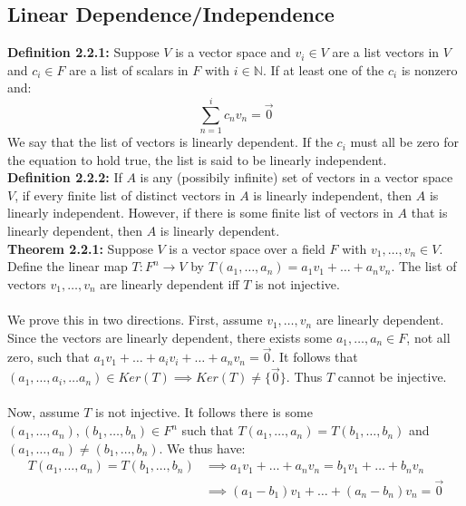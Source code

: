 \documentclass[11pt]{article}
\begin{document}
\newpage

\subsection{Linear Dependence/Independence}

\textbf{Definition 2.2.1:} Suppose $V$ is a vector space and $v_i \in V$ are a list vectors in $V$ and $c_i \in F$ are a list of scalars in $F$ with $i \in \mathbb{N}$. If at least one of the $c_i$ is nonzero and:
\begin{equation*}
    \sum_{n = 1}^{i} c_n v_n = \vec{0}
\end{equation*}
We say that the list of vectors is linearly dependent. If the $c_i$ must all be zero for the equation to hold true, the list is said to be linearly independent. \\
\textbf{Definition 2.2.2:} If $A$ is any (possibily infinite) set of vectors in a vector space $V$, if every finite list of distinct vectors in $A$ is linearly independent, then $A$ is linearly independent. However, if there is some finite list of vectors in $A$ that is linearly dependent, then $A$ is linearly dependent. \\
\textbf{Theorem 2.2.1:} Suppose $V$ is a vector space over a field $F$ with $v_1 , \dots, v_n \in V$. Define the linear map $T : F^n \rightarrow V$ by $T(a_1, \dots, a_n) = a_1 v_1 + \dots + a_n v_n$. The list of vectors $v_1, \dots, v_n$ are linearly dependent iff $T$ is not injective. \\
\vspace{0.1cm} \\
We prove this in two directions. First, assume $v_1 , \dots , v_n$ are linearly dependent. Since the vectors are linearly dependent, there exists some $a_1, \dots, a_n \in F$, not all zero, such that $a_1 v_1 + \dots + a_i v_i + \dots + a_n v_n = \vec{0}$. It follows that $(a_1 , \dots , a_i , \dots a_n) \in Ker(T) \implies Ker(T) \neq \{\vec{0}\}$. Thus $T$ cannot be injective. \\
\vspace{0.1cm} \\
Now, assume $T$ is not injective. It follows there is some $(a_1 , \dots , a_n), (b_1 , \dots , b_n) \in F^n$ such that $T(a_1, \dots, a_n) = T(b_1 , \dots , b_n)$ and $(a_1 , \dots , a_n) \neq (b_1 , \dots , b_n)$. We thus have:
\begin{align*}
    T(a_1 , \dots , a_n) = T(b_1 , \dots , b_n) &\implies a_1 v_1 + \dots + a_n v_n = b_1 v_1 + \dots + b_n v_n \\
                                                &\implies (a_1 - b_1) v_1 + \dots + (a_n - b_n) v_n = \vec{0}
\end{align*}
\end{document}
